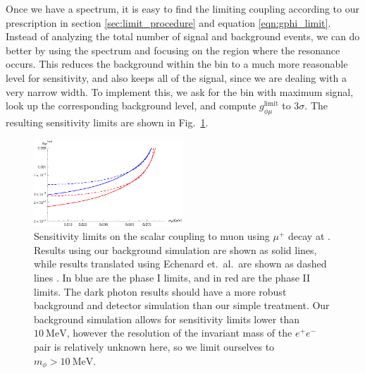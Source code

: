 Once we have a spectrum, it is easy to find the limiting coupling according to our prescription in section \ref{sec:limit_procedure} and equation \ref{eqn:gphi_limit}.
Instead of analyzing the total number of signal and background events, we can do better by using the spectrum and focusing on the region where the resonance occurs.
This reduces the background within the bin to a much more reasonable level for sensitivity, and also keeps all of the signal, since we are dealing with a very narrow width.
To implement this, we ask for the bin with maximum signal, look up the corresponding background level, and compute $g_{\phi\mu}^\textrm{limit}$ to $3\sigma$.
The resulting sensitivity limits are shown in Fig.\ \ref{fig:mu3e_limits}.

\begin{figure}[h]
    \centering
    \includegraphics[width=0.5\textwidth]{Figures/limits/mu3e_all}
    \caption[Sensitivity limits on the scalar coupling to muon using $\mu^+$ decay at \mueee.]{Sensitivity limits on the scalar coupling to muon using $\mu^+$ decay at \mueee. Results using our background simulation are shown as solid lines, while results translated using Echenard et.\ al.\ are shown as dashed lines \cite{Echenard:2014lma}. In blue are the phase I limits, and in red are the phase II limits. The dark photon results should have a more robust background and detector simulation than our simple treatment. Our background simulation allows for sensitivity limits lower than $10~\textrm{MeV}$, however the resolution of the invariant mass of the $e^+ e^-$ pair is relatively unknown here, so we limit ourselves to $m_\phi > 10~\textrm{MeV}$.} 
    \label{fig:mu3e_limits}
\end{figure}


